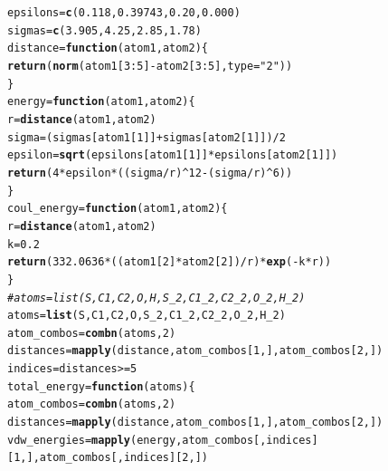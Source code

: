 \documentclass{article}\usepackage[]{graphicx}\usepackage[]{color}
\makeatletter
\newcommand{\hlnum}[1]{\textcolor[rgb]{0.686,0.059,0.569}{#1}}%
\newcommand{\hlstr}[1]{\textcolor[rgb]{0.192,0.494,0.8}{#1}}%
\newcommand{\hlcom}[1]{\textcolor[rgb]{0.678,0.584,0.686}{\textit{#1}}}%
\newcommand{\hlopt}[1]{\textcolor[rgb]{0,0,0}{#1}}%
\newcommand{\hlstd}[1]{\textcolor[rgb]{0.345,0.345,0.345}{#1}}%
\newcommand{\hlkwa}[1]{\textcolor[rgb]{0.161,0.373,0.58}{\textbf{#1}}}%
\newcommand{\hlkwb}[1]{\textcolor[rgb]{0.69,0.353,0.396}{#1}}%
\newcommand{\hlkwc}[1]{\textcolor[rgb]{0.333,0.667,0.333}{#1}}%
\newcommand{\hlkwd}[1]{\textcolor[rgb]{0.737,0.353,0.396}{\textbf{#1}}}%
\newenvironment{kframe}{%
 \def\at@end@of@kframe{}%
 \ifinner\ifhmode%
  \def\at@end@of@kframe{\end{minipage}}%
  \begin{minipage}{\columnwidth}%
 \fi\fi%
 \def\FrameCommand##1{\hskip\@totalleftmargin \hskip-\fboxsep
 \colorbox{shadecolor}{##1}\hskip-\fboxsep
     \hskip-\linewidth \hskip-\@totalleftmargin \hskip\columnwidth}%
 \MakeFramed {\advance\hsize-\width
   \@totalleftmargin\z@ \linewidth\hsize
   \@setminipage}}%
 {\par\unskip\endMakeFramed%
 \at@end@of@kframe}
\newenvironment{knitrout}{}{} %
\makeatother
\begin{document}
\begin{knitrout}
\color{fgcolor}\begin{kframe}
\begin{alltt}
  \hlstd{epsilons}\hlkwb{=}\hlkwd{c}\hlstd{(}\hlnum{0.118}\hlstd{,}\hlnum{0.39743}\hlstd{,}\hlnum{0.20}\hlstd{,}\hlnum{0.000}\hlstd{)}
  \hlstd{sigmas}\hlkwb{=}\hlkwd{c}\hlstd{(}\hlnum{3.905}\hlstd{,}\hlnum{4.25}\hlstd{,}\hlnum{2.85}\hlstd{,}\hlnum{1.78}\hlstd{)}
  \hlstd{distance}\hlkwb{=}\hlkwa{function}\hlstd{(}\hlkwc{atom1}\hlstd{,}\hlkwc{atom2}\hlstd{)\{}
    \hlkwd{return}\hlstd{(}\hlkwd{norm}\hlstd{(atom1[}\hlnum{3}\hlopt{:}\hlnum{5}\hlstd{]}\hlopt{-}\hlstd{atom2[}\hlnum{3}\hlopt{:}\hlnum{5}\hlstd{],}\hlkwc{type}\hlstd{=}\hlstr{"2"}\hlstd{))}
  \hlstd{\}}
  \hlstd{energy}\hlkwb{=}\hlkwa{function}\hlstd{(}\hlkwc{atom1}\hlstd{,}\hlkwc{atom2}\hlstd{)\{}
    \hlstd{r}\hlkwb{=}\hlkwd{distance}\hlstd{(atom1,atom2)}
    \hlstd{sigma} \hlkwb{=} \hlstd{(sigmas[atom1[}\hlnum{1}\hlstd{]]}\hlopt{+}\hlstd{sigmas[atom2[}\hlnum{1}\hlstd{]])}\hlopt{/}\hlnum{2}
    \hlstd{epsilon} \hlkwb{=} \hlkwd{sqrt}\hlstd{(epsilons[atom1[}\hlnum{1}\hlstd{]]}\hlopt{*}\hlstd{epsilons[atom2[}\hlnum{1}\hlstd{]])}
    \hlkwd{return}\hlstd{(}\hlnum{4}\hlopt{*}\hlstd{epsilon}\hlopt{*}\hlstd{((sigma}\hlopt{/}\hlstd{r)}\hlopt{^}\hlnum{12}\hlopt{-}\hlstd{(sigma}\hlopt{/}\hlstd{r)}\hlopt{^}\hlnum{6}\hlstd{))}
  \hlstd{\}}
  \hlstd{coul_energy}\hlkwb{=}\hlkwa{function}\hlstd{(}\hlkwc{atom1}\hlstd{,}\hlkwc{atom2}\hlstd{)\{}
    \hlstd{r}\hlkwb{=}\hlkwd{distance}\hlstd{(atom1,atom2)}
    \hlstd{k}\hlkwb{=}\hlnum{0.2}
    \hlkwd{return}\hlstd{(}\hlnum{332.0636}\hlopt{*}\hlstd{((atom1[}\hlnum{2}\hlstd{]}\hlopt{*}\hlstd{atom2[}\hlnum{2}\hlstd{])}\hlopt{/}\hlstd{r)}\hlopt{*}\hlkwd{exp}\hlstd{(}\hlopt{-}\hlstd{k}\hlopt{*}\hlstd{r))}
  \hlstd{\}}
  \hlcom{#atoms = list(S,C1,C2,O,H,S_2,C1_2,C2_2,O_2,H_2)}
  \hlstd{atoms} \hlkwb{=} \hlkwd{list}\hlstd{(S,C1,C2,O,S_2,C1_2,C2_2,O_2,H_2)}
  \hlstd{atom_combos} \hlkwb{=} \hlkwd{combn}\hlstd{(atoms,}\hlnum{2}\hlstd{)}
  \hlstd{distances}\hlkwb{=}\hlkwd{mapply}\hlstd{(distance,atom_combos[}\hlnum{1}\hlstd{,],atom_combos[}\hlnum{2}\hlstd{,])}
  \hlstd{indices}\hlkwb{=}\hlstd{distances}\hlopt{>=}\hlnum{5}
  \hlstd{total_energy}\hlkwb{=}\hlkwa{function}\hlstd{(}\hlkwc{atoms}\hlstd{)\{}
    \hlstd{atom_combos} \hlkwb{=} \hlkwd{combn}\hlstd{(atoms,}\hlnum{2}\hlstd{)}
    \hlstd{distances}\hlkwb{=}\hlkwd{mapply}\hlstd{(distance,atom_combos[}\hlnum{1}\hlstd{,],atom_combos[}\hlnum{2}\hlstd{,])}
    \hlstd{vdw_energies} \hlkwb{=} \hlkwd{mapply}\hlstd{(energy,atom_combos[,indices][}\hlnum{1}\hlstd{,],atom_combos[,indices][}\hlnum{2}\hlstd{,])}

\end{alltt}
\end{kframe}
\end{knitrout}
\end{document}

